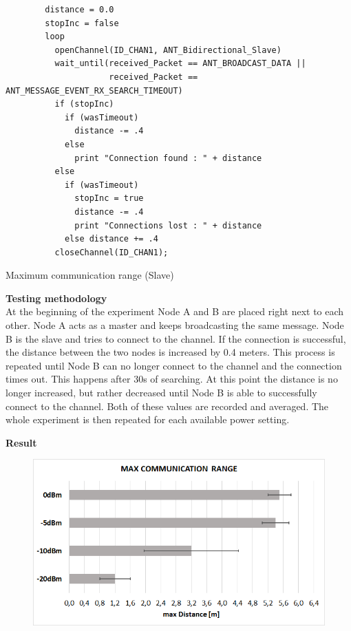 \begin{description}
	\begin{code}[H]
		\begin{verbatim}
		distance = 0.0
		stopInc = false
		loop 
		  openChannel(ID_CHAN1, ANT_Bidirectional_Slave)
		  wait_until(received_Packet == ANT_BROADCAST_DATA || 
		             received_Packet == ANT_MESSAGE_EVENT_RX_SEARCH_TIMEOUT) 
		  if (stopInc) 
		    if (wasTimeout) 
		      distance -= .4
		    else 
		      print "Connection found : " + distance
		  else
		    if (wasTimeout)  
		      stopInc = true
		      distance -= .4
		      print "Connections lost : " + distance
		    else distance += .4
		  closeChannel(ID_CHAN1);
		\end{verbatim}
		\caption{Maximum communication range (Slave)}\label{lst:sExp6}
	\end{code}
	\item{\textbf{Testing methodology}} \hfill \\ At the beginning of the experiment Node A and B are placed right next to each other. Node A acts as a master and keeps broadcasting the same message. Node B is the slave and tries to connect to the channel. If the connection is successful, the distance between the two nodes is increased by 0.4 meters. This process is repeated until Node B can no longer connect to the channel and the connection times out. This happens after 30s of searching. At this point the distance is no longer increased, but rather decreased until Node B is able to successfully connect to the channel. Both of these values are recorded and averaged. The whole experiment is then repeated for each available power setting.	
	\newpage
	\item{\textbf{Result}} \hfill \\ 
	\begin{figure}[H]
		\centering
		\includegraphics[scale=0.5]{content/images/exp6.png}

\end{figure}
\end{description}
